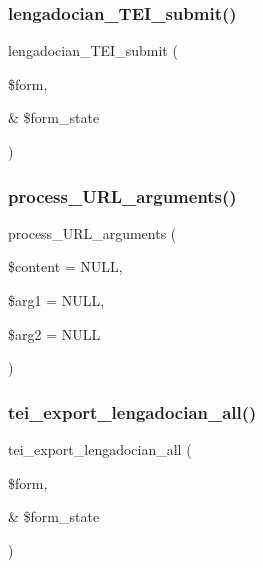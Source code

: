 \subsubsection{\texorpdfstring{lengadocian\+\_\+\+T\+E\+I\+\_\+submit()}{lengadocian\_TEI\_submit()}}
{\footnotesize\ttfamily lengadocian\+\_\+\+T\+E\+I\+\_\+submit (\begin{DoxyParamCaption}\item[{}]{\$form,  }\item[{\&}]{\$form\+\_\+state }\end{DoxyParamCaption})}

\hypertarget{php_2conjoc__lengadocian__web_form_8inc_afecc813b5558b906fe6cc9adb1419c35}{}\label{php_2conjoc__lengadocian__web_form_8inc_afecc813b5558b906fe6cc9adb1419c35} 
\subsubsection{\texorpdfstring{process\+\_\+\+U\+R\+L\+\_\+arguments()}{process\_URL\_arguments()}}
{\footnotesize\ttfamily process\+\_\+\+U\+R\+L\+\_\+arguments (\begin{DoxyParamCaption}\item[{}]{\$content = {\ttfamily NULL},  }\item[{}]{\$arg1 = {\ttfamily NULL},  }\item[{}]{\$arg2 = {\ttfamily NULL} }\end{DoxyParamCaption})}

\hypertarget{php_2conjoc__lengadocian__web_form_8inc_a9c7725a828c1a44761bc51fe7a346215}{}\label{php_2conjoc__lengadocian__web_form_8inc_a9c7725a828c1a44761bc51fe7a346215} 
\subsubsection{\texorpdfstring{tei\+\_\+export\+\_\+lengadocian\+\_\+all()}{tei\_export\_lengadocian\_all()}}
{\footnotesize\ttfamily tei\+\_\+export\+\_\+lengadocian\+\_\+all (\begin{DoxyParamCaption}\item[{}]{\$form,  }\item[{\&}]{\$form\+\_\+state }\end{DoxyParamCaption})}


